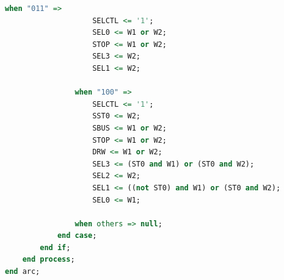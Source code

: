 \documentclass[12pt]{article}
\begin{document}
{\begin{lstlisting}[language=vhdl]
                when "011" => 
                    SELCTL <= '1';
                    SEL0 <= W1 or W2;
                    STOP <= W1 or W2;
                    SEL3 <= W2;
                    SEL1 <= W2;

                when "100" => 
                    SELCTL <= '1';
                    SST0 <= W2;
                    SBUS <= W1 or W2;
                    STOP <= W1 or W2;
                    DRW <= W1 or W2;
                    SEL3 <= (ST0 and W1) or (ST0 and W2);
                    SEL2 <= W2;
                    SEL1 <= ((not ST0) and W1) or (ST0 and W2);
                    SEL0 <= W1;

                when others => null;
            end case;
        end if;
    end process;
end arc;
        \end{lstlisting}

}
\end{document}
